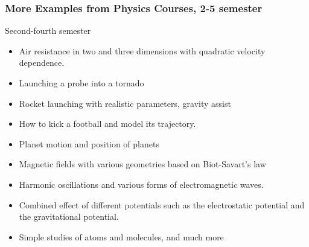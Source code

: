 \documentclass{beamer}
\begin{document}
\begin{frame}
\frametitle{More Examples from Physics Courses, 2-5 semester}

\begin{block}{Second-fourth semester }

\begin{itemize}
\item Air resistance in two and three dimensions with quadratic velocity dependence.

\item Launching a probe into a tornado

\item Rocket launching with realistic parameters, gravity assist

\item How to kick a football and model its trajectory.

\item Planet motion and position of planets

\item Magnetic fields with various geometries based on Biot-Savart's law

\item Harmonic oscillations and various forms of electromagnetic waves.

\item Combined effect of different potentials such as the electrostatic potential and the gravitational potential.

\item Simple studies of atoms and molecules, and much more
\end{itemize}

\noindent
\end{block}
\end{frame}
\end{document}
